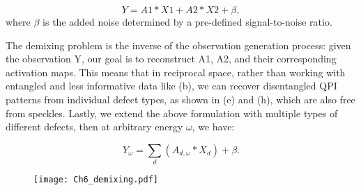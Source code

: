 \begin{equation}
	Y = A1 * X1 + A2 * X2 + \beta, 
\end{equation}
where $\beta$ is the added noise determined by a pre-defined signal-to-noise ratio.

The demixing problem is the inverse of the observation generation process: given the observation 
Y, our goal is to reconstruct A1, A2, and their corresponding activation maps. This means that in reciprocal space, rather than working with entangled and less informative data like (b), we can recover disentangled QPI patterns from individual defect types, as shown in (e) and (h), which are also free from speckles. Lastly, we extend the above formulation with multiple types of different defects, then at arbitrary energy $\omega$, we have: 

\begin{equation}
	\label{eq:demixing}
	Y_{\omega} = \sum_d ( A_{d,{\omega}} * X_d) + \beta. 
\end{equation} 

\begin{figure}
	\texttt{[image: Ch6\_demixing.pdf]} 
	\centering
	\caption{}
	\label{fig:ch6_demix}
\end{figure}


